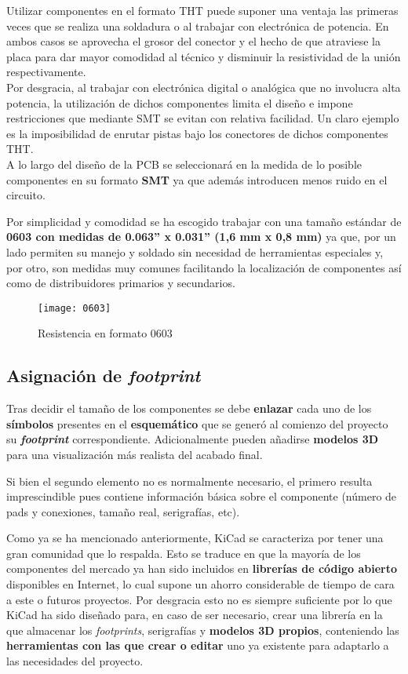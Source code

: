 Utilizar componentes en el formato \acrshort{THT} puede suponer una ventaja las primeras veces que se realiza una soldadura o al trabajar con electrónica de potencia. En ambos casos se aprovecha el grosor del conector y el hecho de que atraviese la placa para dar mayor comodidad al técnico y disminuir la resistividad de la unión respectivamente. 
\\Por desgracia, al trabajar con electrónica digital o analógica que no involucra alta potencia, la utilización de dichos componentes limita el diseño e impone restricciones que mediante \acrshort{SMT} se evitan con relativa facilidad. Un claro ejemplo es la imposibilidad de enrutar pistas bajo los conectores de dichos componentes \acrshort{THT}.
\\A lo largo del diseño de la \acrshort{PCB} se seleccionará en la medida de lo posible componentes en su formato \textbf{\acrshort{SMT}} ya que además introducen menos ruido en el circuito.

Por simplicidad y comodidad se ha escogido trabajar con una tamaño estándar de \textbf{0603 con medidas de 0.063'' x 0.031'' (1,6 mm x 0,8 mm)} ya que, por un lado permiten su manejo y soldado sin necesidad de herramientas especiales y, por otro, son medidas muy comunes facilitando la localización de componentes así como de distribuidores primarios y secundarios.

\begin{figure} [h]
    \centering
    \texttt{[image: 0603]}
    \caption{Resistencia en formato 0603 \cite{Imagen_0603}}
    \label{fig:0603}
\end{figure}

\subsection{Asignación de \textit{footprint}\label{sec:Enlazado}}

Tras decidir el tamaño de los componentes se debe \textbf{enlazar} cada uno de los \textbf{símbolos} presentes en el \textbf{esquemático} que se generó al comienzo del proyecto su \textbf{\textit{footprint}} correspondiente. Adicionalmente pueden añadirse \textbf{modelos 3D} para una visualización más realista del acabado final.

Si bien el segundo elemento no es normalmente necesario, el primero resulta imprescindible pues contiene información básica sobre el componente (número de pads y conexiones, tamaño real, serigrafías, etc). 

Como ya se ha mencionado anteriormente, KiCad se caracteriza por tener una gran comunidad que lo respalda. Esto se traduce en que la mayoría de los componentes del mercado ya han sido incluidos en \textbf{librerías de código abierto} disponibles en Internet, lo cual supone un ahorro considerable de tiempo de cara a este o futuros proyectos. 
Por desgracia esto no es siempre suficiente por lo que KiCad ha sido diseñado para, en caso de ser necesario, crear una librería en la que almacenar los \textit{footprints}, serigrafías y \textbf{modelos 3D propios}, conteniendo las \textbf{herramientas con las que crear o editar} uno ya existente para adaptarlo a las necesidades del proyecto.

